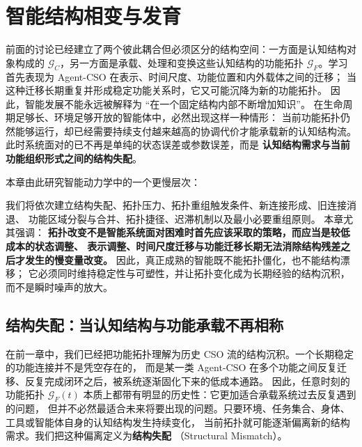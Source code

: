 \chapter{智能结构相变与发育}
\label{chap:intelligence_topological_development}

\begin{chapterlead}
前面的讨论已经建立了两个彼此耦合但必须区分的结构空间：一方面是认知结构对象构成的
$\mathcal G_C$，另一方面是承载、处理和变换这些认知结构的功能拓扑
$\mathcal G_F$。学习首先表现为 Agent-CSO 在表示、时间尺度、功能位置和内外载体之间的迁移；
当这种迁移长期重复并形成稳定功能关系时，它又可能沉降为新的功能拓扑。
因此，智能发展不能永远被解释为 ``在一个固定结构内部不断增加知识''。
在生命周期足够长、环境足够开放的智能体中，必然出现这样一种情形：
当前功能拓扑仍然能够运行，却已经需要持续支付越来越高的协调代价才能承载新的认知结构流。
此时系统面对的已不再是单纯的状态误差或参数误差，而是
\textbf{认知结构需求与当前功能组织形式之间的结构失配}。

本章由此研究智能动力学中的一个更慢层次：
\begin{statementbox}
\centering
{}
\end{statementbox}
我们将依次建立结构失配、拓扑压力、拓扑重组触发条件、新连接形成、旧连接消退、
功能区域分裂与合并、拓扑捷径、迟滞机制以及最小必要重组原则。
本章尤其强调：
\textbf{拓扑改变不是智能系统面对困难时首先应该采取的策略，而应当是较低成本的状态调整、
表示调整、时间尺度迁移与功能迁移长期无法消除结构残差之后才发生的慢变量改变。}
因此，真正成熟的智能既不能拓扑僵化，也不能结构漂移；
它必须同时维持稳定性与可塑性，并让拓扑变化成为长期经验的结构沉积，而不是瞬时噪声的放大。
\end{chapterlead}


\section{结构失配：当认知结构与功能承载不再相称}

在前一章中，我们已经把功能拓扑理解为历史 CSO 流的结构沉积。一个长期稳定的功能连接并不是凭空存在的，
而是某一类 Agent-CSO 在多个功能之间反复迁移、反复完成闭环之后，被系统逐渐固化下来的低成本通路。
因此，任意时刻的功能拓扑 $\mathcal G_F(t)$ 本质上都带有明显的历史性：它更加适合承载系统过去反复遇到的问题，
但并不必然最适合未来将要出现的问题。只要环境、任务集合、身体、工具或智能体自身的认知结构发生持续变化，
当前拓扑就可能逐渐偏离新的结构需求。我们把这种偏离定义为\textbf{结构失配}
（Structural Mismatch）。

